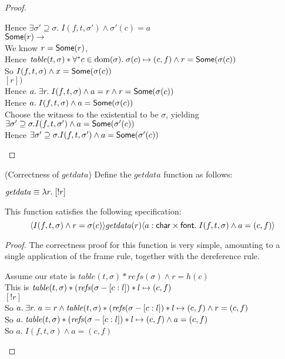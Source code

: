 \begin{proof}
\begin{tabbedproof}
\oooo Hence $\exists \sigma' \supseteq \sigma.\; I(f, t, \sigma') \land \sigma'(c) = a$ \\
\ooo $\mathsf{Some}(r) \to $ \\
\oooo We know $r = \mathsf{Some}(r)$, \\
\oooo Hence $\mathit{table}(t, \sigma) * \forall^{*}c \in \mbox{dom}({\sigma}).\;\sigma(c) \mapsto (c,f) \land r = \mathsf{Some}(\sigma(c))$\\
\oooo So $I(f, t, \sigma) \land x = \mathsf{Some}(\sigma(c))$ \\
\oooo $[r])$ \\
\oooo Hence $a.\; \exists r.\; I(f, t, \sigma) \land a = r \land r = \mathsf{Some}(\sigma(c))$\\
\oooo Hence $a.\; I(f, t, \sigma) \land a = \mathsf{Some}(\sigma(c))$\\
\oooo Choose the witness to the existential to be $\sigma$, yielding \\
\ooox $\exists \sigma' \supseteq \sigma. I(f, t, \sigma') \land a = \mathsf{Some}(\sigma'(c))$ \\
\oo Hence $\exists \sigma' \supseteq \sigma. I(f, t, \sigma') \land a = \mathsf{Some}(\sigma'(c))$

\end{tabbedproof}
\end{proof}

\begin{lemma}{(Correctness of $\mathit{getdata}$)}
Define the $\mathit{getdata}$ function as follows:
\begin{tabbing}
\qquad $\mathit{getdata} \equiv \lambda r.\;[!r]$  
\end{tabbing}

\noindent This function satisfies the following specification:
\begin{displaymath}
  \langle{I(f, t, \sigma) \land r = \sigma(c)}\rangle{\mathit{getdata}(r)}\langle{a:\mathsf{char}\times \mathsf{font}}.\;{I(f, t, \sigma) \land a = (c, f)}\rangle
\end{displaymath}
\end{lemma}

\begin{proof}
The correctness proof for this function is very simple, amounting to a single application
of the frame rule, together with the dereference rule.
\begin{tabbedproof}
\oo Assume our state is $\mathit{table}(t, \sigma) * \mathit{refs}(\sigma) \land r = h(c)$ \\
\oo This is $\mathit{table}(t, \sigma) * (\mathit{refs}(\sigma - [c:l]) * l \mapsto (c,f)$ \\
\oo $[!r]$ \\
\oo So $a.\; \exists r.\; a = r \land \mathit{table}(t, \sigma) * (\mathit{refs}(\sigma - [c:l]) * l \mapsto (c,f) \land r = (c,f)$ \\
\oo So $a.\; \mathit{table}(t, \sigma) * (\mathit{refs}(\sigma - [c:l]) * l \mapsto (c,f) \land a = (c,f)$ \\
\oo So $a.\; I(f, t, \sigma) \land a = (c,f)$
\end{tabbedproof}
\end{proof}

